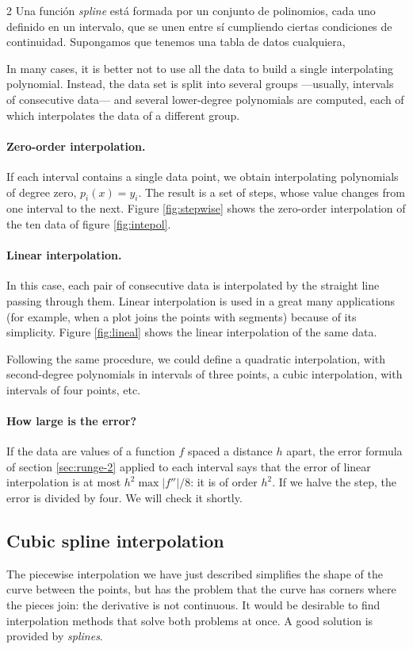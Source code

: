 \begin{paracol}{2}
Una función \emph{spline} está formada por un conjunto de polinomios, cada uno definido en un intervalo, que se unen entre sí cumpliendo ciertas condiciones de continuidad. Supongamos que tenemos una tabla de datos cualquiera,

\switchcolumn
In many cases, it is better not to use all the data to build a single interpolating polynomial. Instead, the data set is split into several groups ---usually, intervals of consecutive data--- and several lower-degree polynomials are computed, each of which interpolates the data of a different group.

\paragraph{Zero-order interpolation.}  If each interval contains a single data point, we obtain interpolating polynomials of degree zero, $p_i(x)=y_i$. The result is a set of steps, whose value changes from one interval to the next. Figure \ref{fig:stepwise} shows the zero-order interpolation of the ten data of figure \ref{fig:intepol}.

\paragraph{Linear interpolation.}  In this case, each pair of consecutive data is interpolated by the straight line passing through them. Linear interpolation is used in a great many applications (for example, when a plot joins the points with segments) because of its simplicity. Figure \ref{fig:lineal} shows the linear interpolation of the same data.

Following the same procedure, we could define a quadratic interpolation, with second-degree polynomials in intervals of three points, a cubic interpolation, with intervals of four points, etc.

\paragraph{How large is the error?} If the data are values of a function $f$ spaced a distance $h$ apart, the error formula of section \ref{sec:runge-2} applied to each interval says that the error of linear interpolation is at most $h^2\max\lvert f''\rvert/8$: it is of order $h^2$. If we halve the step, the error is divided by four. We will check it shortly.

\subsection{Cubic spline interpolation}
The piecewise interpolation we have just described simplifies the shape of the curve between the points, but has the problem that the curve has corners where the pieces join: the derivative is not continuous. It would be desirable to find interpolation methods that solve both problems at once. A good solution is provided by \emph{splines}.


\end{paracol}
